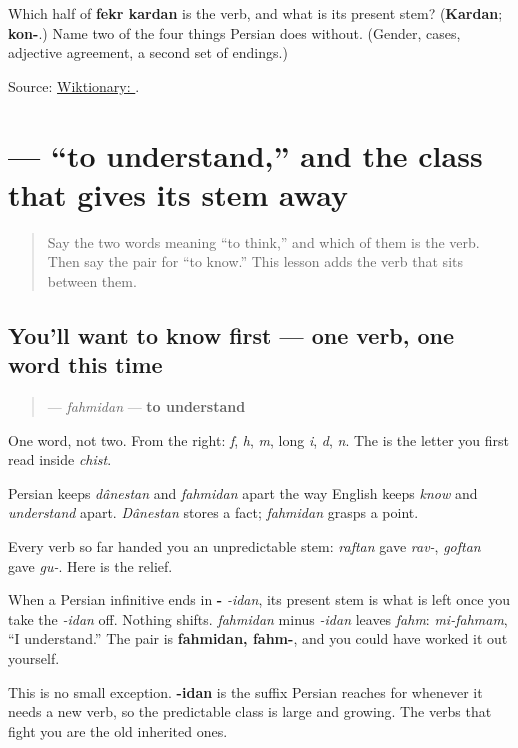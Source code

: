 \begin{tcolorbox}[breakable,colback=teal!4,colframe=teal!35!black,title={Before you move on}]
Which half of \textbf{fekr kardan} is the verb, and what is its present stem? (\textbf{Kardan}; \textbf{kon-}.) Name two of the four things Persian does without. (Gender, cases, adjective agreement, a second set of endings.)

Source: \href{https://en.wiktionary.org/wiki/\%DA\%A9\%D8\%B1\%D8\%AF\%D9\%86}{Wiktionary: }.
\end{tcolorbox}
\section[\texorpdfstring{\fa{فهمیدن} (fahmidan)}{فهمیدن (fahmidan)}]{ — “to understand,” and the class that gives its stem away}

\label{lesson:FA-C07-fahmidan}



\begin{quote}
Say the two words meaning “to think,” and which of them is the verb. Then say the pair for “to know.” This lesson adds the verb that sits between them.
\end{quote}

\subsection*{You'll want to know first — one verb, one word this time}
\begin{quote}
\textbf{} — \emph{fahmidan} — \textbf{to understand}
\end{quote}

One word, not two. From the right: \textbf{} \emph{f}, \textbf{} \emph{h}, \textbf{} \emph{m}, \textbf{} long \emph{i}, \textbf{} \emph{d}, \textbf{} \emph{n}. The \textbf{} is the letter you first read inside \emph{chist}.

Persian keeps \emph{dânestan} and \textbf{} \emph{fahmidan} apart the way English keeps \emph{know} and \emph{understand} apart. \emph{Dânestan} stores a fact; \emph{fahmidan} grasps a point.

\begin{grammarlens}[title={Grammar Lens: the one stem you never have to be told}]
Every verb so far handed you an unpredictable stem: \emph{raftan} gave \emph{rav-}, \emph{goftan} gave \emph{gu-}. Here is the relief.

When a Persian infinitive ends in \textbf{-} \emph{-idan}, its present stem is what is left once you take the \emph{-idan} off. Nothing shifts. \textbf{} \emph{fahmidan} minus \emph{-idan} leaves \textbf{} \emph{fahm}: \emph{mi-fahmam}, “I understand.” The pair is \textbf{fahmidan, fahm-}, and you could have worked it out yourself.

This is no small exception. \textbf{-idan} is the suffix Persian reaches for whenever it needs a new verb, so the predictable class is large and growing. The verbs that fight you are the old inherited ones.
\end{grammarlens}

